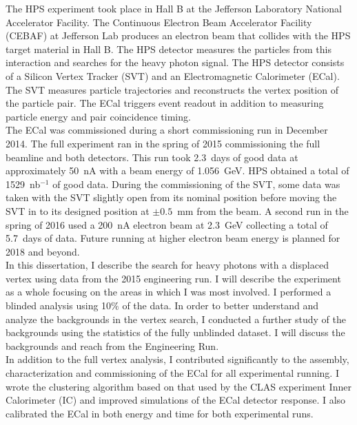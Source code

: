\indent The HPS experiment took place in Hall B at the Jefferson Laboratory National Accelerator Facility. The Continuous Electron Beam Accelerator Facility (CEBAF) at Jefferson Lab produces an electron beam that collides with the HPS target material in Hall B. The HPS detector measures the particles from this interaction and searches for the heavy photon signal. The HPS detector consists of a Silicon Vertex Tracker (SVT) and an Electromagnetic Calorimeter (ECal). The SVT measures particle trajectories and reconstructs the vertex position of the particle pair. The ECal triggers event readout in addition to measuring particle energy and pair coincidence timing. \\
\indent The ECal was commissioned during a short commissioning run in December 2014. The full experiment ran in the spring of 2015 commissioning the full beamline and both detectors. This run took 2.3~days of good data at approximately 50~nA with a beam energy of 1.056~GeV. HPS obtained a total of 1529~nb$^{-1}$ of good data. During the commissioning of the SVT, some data was taken with the SVT slightly open from its nominal position before moving the SVT in to its designed position at $\pm0.5$~mm from the beam. A second run in the spring of 2016 used a 200~nA electron beam at 2.3~GeV collecting a total of 5.7~days of data.  Future running at higher electron beam energy is planned for 2018 and beyond.\\
\indent In this dissertation, I describe the search for heavy photons with a displaced vertex using data from the 2015 engineering run. I will describe the experiment as a whole focusing on the areas in which I was most involved. I performed a blinded analysis using 10$\%$ of the data. In order to better understand and analyze the backgrounds in the vertex search, I conducted a further study of the backgrounds using the statistics of the fully unblinded dataset. I will discuss the backgrounds and reach from the Engineering Run.\\
\indent In addition to the full vertex analysis, I contributed significantly to the assembly, characterization and commissioning of the ECal for all experimental running. I wrote the clustering algorithm based on that used by the CLAS experiment Inner Calorimeter (IC) and improved simulations of the ECal detector response. I also calibrated the ECal in both energy and time for both experimental runs. 